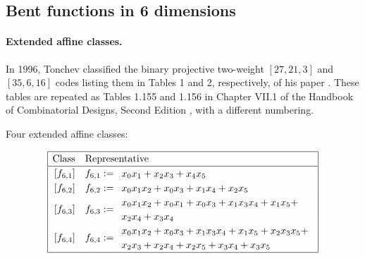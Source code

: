 \documentclass[12pt,a4paper]{article}
\begin{document}
\subsection{Bent functions in 6 dimensions}
\paragraph*{Extended affine classes.}

In 1996, Tonchev classified the binary projective two-weight $[27,21,3]$ and $[35,6,16]$ codes
listing them in Tables 1 and 2, respectively, of his paper \cite{Ton96uniformly}.
These tables are repeated as Tables 1.155 and 1.156 in Chapter VII.1 of the Handbook of
Combinatorial Designs, Second Edition \cite{Ton07codes},
with a different numbering.

Four extended affine classes:

\begin{align*}
\def\arraystretch{1.2}
\begin{array}{|cl|}
\hline
\text{Class} &
\text{Representative}
\\
\hline
\,[f_{6,1}] & f_{6,1} :=
\begin{array}{l}
x_{0} x_{1} + x_{2} x_{3} + x_{4} x_{5}
\end{array}
\\
\,[f_{6,2}] & f_{6,2} :=
\begin{array}{l}
x_{0} x_{1} x_{2} + x_{0} x_{3} + x_{1} x_{4} + x_{2} x_{5}
\end{array}
\\
\,[f_{6,3}] & f_{6,3} :=
\begin{array}{l}
x_{0} x_{1} x_{2} + x_{0} x_{1} + x_{0} x_{3} + x_{1} x_{3} x_{4} + x_{1} x_{5} +
\\
x_{2} x_{4} + x_{3} x_{4}
\end{array}
\\
\,[f_{6,4}] & f_{6,4} :=
\begin{array}{l}
x_{0} x_{1} x_{2} + x_{0} x_{3} + x_{1} x_{3} x_{4} + x_{1} x_{5} + x_{2} x_{3} x_{5} +
\\
x_{2} x_{3} + x_{2} x_{4} + x_{2} x_{5} + x_{3} x_{4} + x_{3} x_{5}
\end{array}
\\
\hline
\end{array}
\end{align*}
\end{document}

